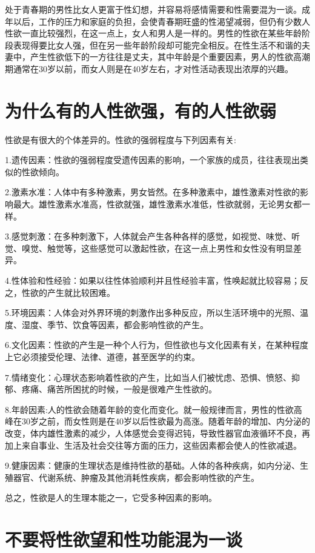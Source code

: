 \documentclass[12pt,UTF8]{ctexbook}
\begin{document}
处于青春期的男性比女人更富于性幻想，并容易将感情需要和性需要混为一谈。成年以后，工作的压力和家庭的负担，会使青春期旺盛的性渴望减弱，但仍有少数人性欲一直比较强烈，在这一点上，女人和男人是一样的。男性的性欲在某些年龄阶段表现得要比女人强，但在另一些年龄阶段却可能完全相反。在性生活不和谐的夫妻中，产生性欲低下的一方往往是丈夫，其中年龄是个重要因素，男人的性欲高潮期通常在30岁以前，而女人则是在40岁左右，才对性活动表现出浓厚的兴趣。

\chapter{为什么有的人性欲强，有的人性欲弱}

性欲是有很大的个体差异的。性欲的强弱程度与下列因素有关:

1.遗传因素：性欲的强弱程度受遗传因素的影响，一个家族的成员，往往表现出类似的性欲倾向。

2.激素水准：人体中有多种激素，男女皆然。在多种激素中，雄性激素对性欲的影响最大。雄性激素水准高，性欲就强，雄性激素水准低，性欲就弱，无论男女都一样。

3.感觉刺激：在多种刺激下，人体就会产生各种各样的感觉，如视觉、味觉、听觉、嗅觉、触觉等，这些感觉可以激起性欲，在这一点上男性和女性没有明显差异。

4.性体验和性经验：如果以往性体验顺利并且性经验丰富，性唤起就比较容易；反之，性欲的产生就比较困难。

5.环境因素：人体会对外界环境的刺激作出多种反应，所以生活环境中的光照、温度、湿度、季节、饮食等因素，都会影响性欲的产生。

6.文化因素：性欲的产生是一种个人行为，但性欲也与文化因素有关，在某种程度上它必须接受伦理、法律、道德，甚至医学的约束。

7.情绪变化：心理状态影响着性欲的产生，比如当人们被忧虑、恐惧、愤怒、抑郁、疼痛、痛苦所困扰的时候，一般是很难产生性欲的。

8.年龄因素:人的性欲会随着年龄的变化而变化。就一般规律而言，男性的性欲高峰在30岁之前，而女性则是在40岁以后性欲最为高涨。随着年龄的增加、内分泌的改变，体内雄性激素的减少，人体感觉会变得迟钝，导致性器官血液循环不良，再加上来自事业、生活及社会交往等方面的压力，这些因素都会使人的性欲减退。

9.健康因素：健康的生理状态是维持性欲的基础。人体的各种疾病，如内分泌、生殖器官、代谢系统、肿瘤及其他消耗性疾病，都会影响性欲的产生。

总之，性欲是人的生理本能之一，它受多种因素的影响。

\chapter{不要将性欲望和性功能混为一谈}
\end{document}
